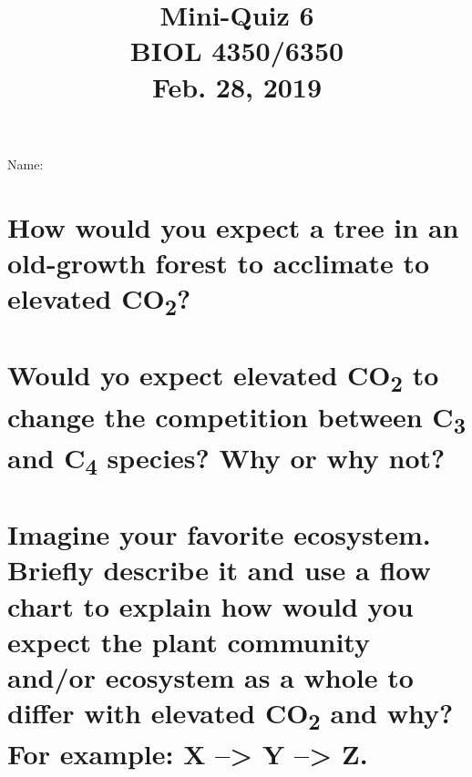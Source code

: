 \documentclass[12pt, notitlepage]{article}   	%
\title{
	\textbf{
		Mini-Quiz 6
	} \\
	\large BIOL 4350/6350 \\
	\large Feb. 28, 2019 \\
}
\date{\vspace{-5ex}}
\def\wl{\par \vspace{\baselineskip}}
\begin{document}
{\selectfont %

\large{Name:}

{\let\newpage\relax\maketitle}

\section{\small{How would you expect a tree in an old-growth forest to acclimate
to elevated CO\textsubscript{2}?}}
\wl
\wl
\wl
\wl
\wl
\wl
\wl
\wl
\wl
\wl

\section{\small{Would yo expect elevated CO\textsubscript{2} to change the competition
between C\textsubscript{3} and C\textsubscript{4} species? Why or why not?}}

\newpage

\section{\small{Imagine your favorite ecosystem. Briefly describe it and 
use a flow chart to explain how would you expect the plant community
and/or ecosystem as a whole to differ with elevated CO\textsubscript{2} and why?
For example: X --> Y --> Z.}}

} %
\end{document}
